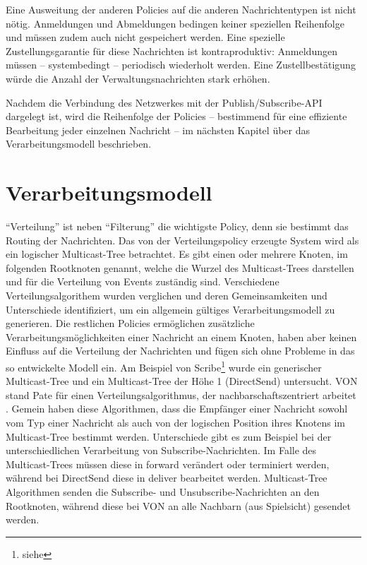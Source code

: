 Eine Ausweitung der anderen Policies auf die anderen Nachrichtentypen ist nicht nötig. Anmeldungen und Abmeldungen bedingen keiner speziellen Reihenfolge und müssen zudem auch nicht gespeichert werden. Eine spezielle Zustellungsgarantie für diese Nachrichten ist kontraproduktiv:  Anmeldungen müssen -- systembedingt -- periodisch wiederholt werden. Eine Zustellbestätigung würde die Anzahl der Verwaltungsnachrichten stark erhöhen.

Nachdem die Verbindung des Netzwerkes mit der Publish/Subscribe-API dargelegt ist, wird die Reihenfolge der Policies -- bestimmend für eine effiziente Bearbeitung jeder einzelnen Nachricht -- im nächsten Kapitel über das Verarbeitungsmodell beschrieben.

\section{Verarbeitungsmodell}
``Verteilung'' ist neben ``Filterung'' die wichtigste Policy, denn sie bestimmt das Routing der Nachrichten. Das von der Verteilungspolicy erzeugte System wird als ein logischer Multicast-Tree betrachtet. Es gibt einen oder mehrere Knoten, im folgenden Rootknoten genannt, welche die Wurzel des Multicast-Trees darstellen und für die Verteilung von Events zuständig sind. Verschiedene Verteilungsalgorithem wurden verglichen und deren Gemeinsamkeiten und Unterschiede identifiziert, um ein allgemein gültiges Verarbeitungsmodell zu generieren. Die restlichen Policies ermöglichen zusätzliche Verarbeitungsmöglichkeiten einer Nachricht an einem Knoten, haben aber keinen Einfluss auf die Verteilung der Nachrichten und fügen sich ohne Probleme in das so entwickelte Modell ein. Am Beispiel von Scribe\footnote{siehe } wurde ein generischer Multicast-Tree und ein Multicast-Tree der Höhe 1 (DirectSend) untersucht. VON stand Pate für einen Verteilungsalgorithmus, der nachbarschaftszentriert arbeitet \cite{Hu2006VON}. Gemein haben diese Algorithmen, dass die Empfänger einer Nachricht sowohl vom Typ einer Nachricht als auch von der logischen Position ihres Knotens im Multicast-Tree bestimmt werden. Unterschiede gibt es zum Beispiel bei der unterschiedlichen Verarbeitung von Subscribe-Nachrichten. Im Falle des Multicast-Trees müssen diese in forward verändert oder terminiert werden, während bei DirectSend diese in deliver bearbeitet werden. Multicast-Tree Algorithmen senden die Subscribe- und Unsubscribe-Nachrichten an den Rootknoten, während diese bei VON an alle Nachbarn (aus Spielsicht) gesendet werden.

